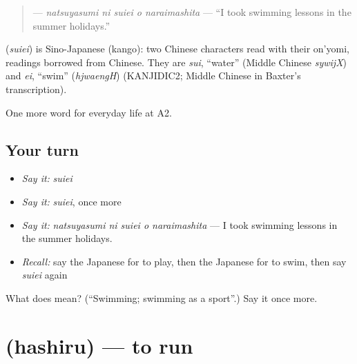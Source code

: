 \begin{quote}
\textbf{  } — \emph{natsuyasumi ni suiei o naraimashita} — \textquotedblleft{}I took swimming lessons in the summer holidays.\textquotedblright{}
\end{quote}

\begin{cousinweb}
\textbf{} (\emph{suiei}) is Sino-Japanese (kango): two Chinese characters read with their on'yomi, readings borrowed from Chinese. They are \emph{sui}, \textquotedblleft{}water\textquotedblright{} (Middle Chinese \emph{sywijX}) and \emph{ei}, \textquotedblleft{}swim\textquotedblright{} (\emph{hjwaengH}) (KANJIDIC2; Middle Chinese in Baxter's transcription).
\end{cousinweb}

\begin{grammarlens}[title={What you've built}]
One more word for everyday life at A2.
\end{grammarlens}

\subsection*{Your turn}
\begin{itemize}
\raggedright
  \item \emph{Say it:} \emph{suiei}
  \item \emph{Say it:} \emph{suiei}, once more
  \item \emph{Say it:} \emph{natsuyasumi ni suiei o naraimashita} — I took swimming lessons in the summer holidays.
  \item \emph{Recall:} say the Japanese for to play, then the Japanese for to swim, then say \emph{suiei} again
\end{itemize}

\begin{tcolorbox}[breakable,colback=teal!4,colframe=teal!35!black,title={Before you move on}]
What does  mean? (\textquotedblleft{}Swimming; swimming as a sport\textquotedblright{}.) Say it once more.
\end{tcolorbox}
\section[\texorpdfstring{\ja{はしる} (hashiru)}{はしる (hashiru)}]{ (hashiru) — to run}

\label{lesson:JA-C233-hashiru}



